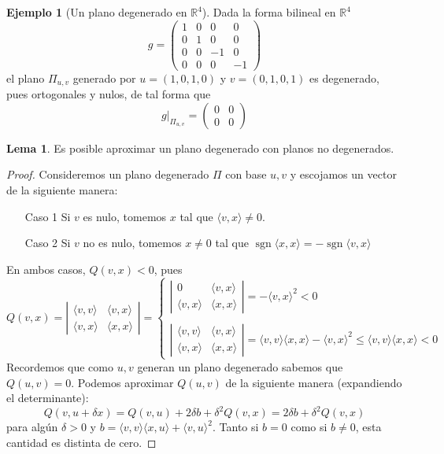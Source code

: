 \documentclass[spanish]{book}
\theoremstyle{definition}
\newtheorem*{lema}{Lema}
\newtheorem*{ejem}{Ejemplo}
\newcommand{\R}{\mathbb{R}}
\DeclareMathOperator{\sgn}{sgn}
\begin{document}
	\begin{ejem}[Un plano degenerado en $\R^4$]
		Dada la forma bilineal en $\R^4$
		\[g=\begin{pmatrix}
			1&0&0&0\\
			0&1&0&0\\
			0&0&-1&0\\
			0&0&0&-1
		\end{pmatrix}\]
		el plano $\Pi_{u,v}$ generado por $u=(1,0,1,0)$ y $v=(0,1,0,1)$ es degenerado, pues ortogonales y nulos, de tal forma que
		\[g|_{\Pi_{u,v}}=\begin{pmatrix}
			0&0\\
			0&0
		\end{pmatrix}\]
	\end{ejem}
	
	\begin{lema}
		Es posible aproximar un plano degenerado con planos no degenerados.
	\end{lema}
	
	\begin{proof}
		Consideremos un plano degenerado $\Pi$ con base $u,v$
	y escojamos un vector de la siguiente manera:
	
	\begin{enumerate}
		\item[Caso 1] Si $v$ es nulo, tomemos $x$ tal que $\langle v,x\rangle\neq0$.
		
		\item[Caso 2] Si $v$ no es nulo, tomemos $x\neq0$ tal que $\sgn\langle x,x\rangle=-\sgn\langle v,x\rangle$
	\end{enumerate}
	En ambos casos, $Q(v,x)<0$, pues
	\[Q(v,x)=\left|\begin{matrix}
		\langle v,v\rangle&\langle v,x\rangle\\
		\langle v,x\rangle&\langle x,x\rangle
	\end{matrix}\right|
	=\begin{cases}
		\left|\begin{matrix}
			0&\langle v,x\rangle\\
			\langle v,x\rangle&\langle x,x\rangle
		\end{matrix}\right|=-\langle v,x\rangle^2<0\\ \\
		\left|\begin{matrix}
			\langle v,v\rangle&\langle v,x\rangle\\
			\langle v,x\rangle&\langle x,x\rangle
		\end{matrix}\right|=\langle v,v\rangle\langle x,x\rangle-\langle v,x\rangle^2\leq\langle v,v\rangle\langle x,x\rangle<0
	\end{cases}\]
	Recordemos que como $u,v$ generan un plano degenerado sabemos que $Q(u,v)=0$. Podemos aproximar $Q(u,v)$ de la siguiente manera (expandiendo el determinante):
	\[Q(v,u+\delta x)=Q(v,u)+2\delta b+\delta^2 Q(v,x)=2\delta b+\delta^2 Q(v,x)\]
	para algún $\delta>0$ y $b=\langle v,v\rangle\langle x,u\rangle+\langle v,u\rangle^2$. Tanto si $b=0$ como si $b\neq0$, esta cantidad es distinta de cero.
	\end{proof}
	
\end{document}
